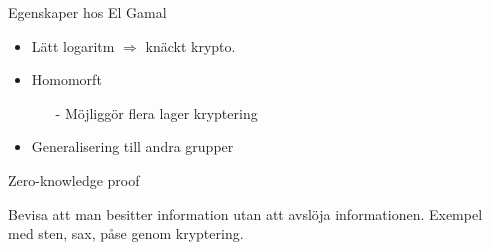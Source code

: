 \begin{frame}{Egenskaper hos El Gamal}

\begin{itemize}
\item Lätt logaritm $\Rightarrow$ knäckt krypto.
\item Homomorft
\begin{itemize}
\item[-] Möjliggör flera lager kryptering
\end{itemize}
\item Generalisering till andra grupper
\end{itemize}

\end{frame}

\begin{frame}{Zero-knowledge proof}

Bevisa att man besitter information utan att avslöja informationen. Exempel med sten, sax, påse genom kryptering. 

\end{frame}